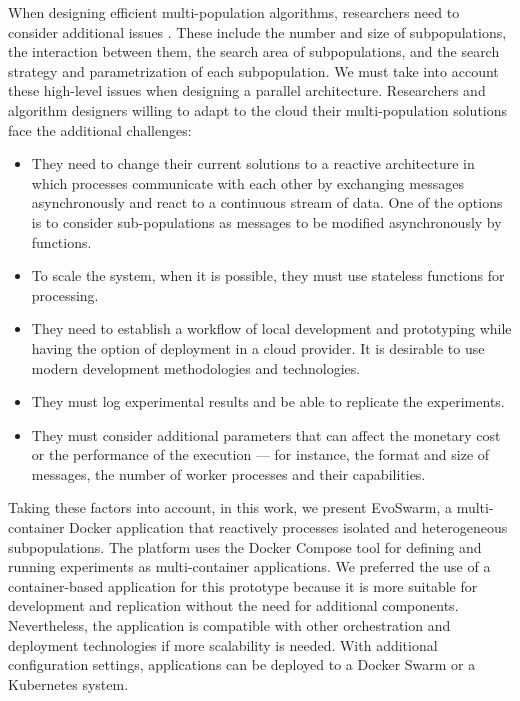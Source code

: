 \documentclass[review]{elsarticle}
\begin{document}
When designing efficient multi-population algorithms, researchers need to
consider additional issues \cite{Ma2019}. These include the number and size of subpopulations,
the interaction between them, the search area of subpopulations, and the search
strategy and parametrization of each subpopulation. We must take into account
these high-level issues when designing a parallel architecture. Researchers 
and algorithm designers willing to  adapt to the cloud their
multi-population solutions face the additional challenges:
\begin{itemize}
    \item They need to change their current solutions to a reactive architecture in which processes
    communicate with each other by exchanging messages asynchronously and react
    to a continuous stream of data. One of the options is to consider
    sub-populations as messages to be modified asynchronously by functions. 

    \item To scale the system, when it is possible, they must use stateless functions for
    processing. 

    \item They need to establish a workflow of local development and prototyping while having the 
    option of deployment in a cloud provider. It is desirable to use modern development methodologies and technologies. 

    \item They must log experimental results and be able to replicate the experiments. 

    \item They must consider additional parameters that can affect the monetary cost or the performance of the
    execution — for instance, the format and size of messages, the number of
    worker processes and their capabilities.  
\end{itemize}

Taking these factors into account, in this work, we present EvoSwarm, 
a multi-container Docker application that reactively processes isolated and
heterogeneous subpopulations. The platform uses the Docker Compose tool for
defining and running experiments as multi-container applications. 
We preferred the use of a container-based application for this prototype because
it is more suitable for development and replication without the need for
additional components. Nevertheless, the application is compatible with other
orchestration and deployment technologies if more scalability is needed. 
With additional configuration settings, applications can be deployed 
to a Docker Swarm or a Kubernetes system.  
\end{document}
